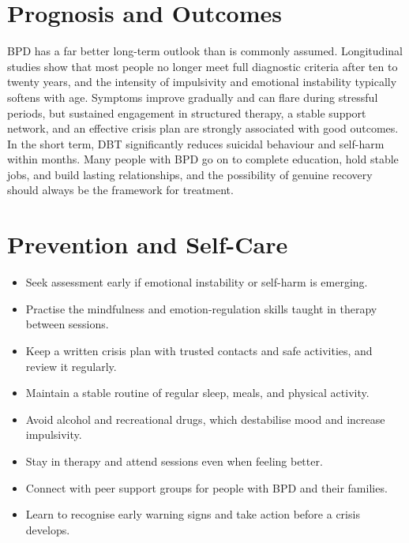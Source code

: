 \section*{Prognosis and Outcomes}
BPD has a far better long-term outlook than is commonly assumed. Longitudinal studies show that most people no longer meet full diagnostic criteria after ten to twenty years, and the intensity of impulsivity and emotional instability typically softens with age. Symptoms improve gradually and can flare during stressful periods, but sustained engagement in structured therapy, a stable support network, and an effective crisis plan are strongly associated with good outcomes. In the short term, DBT significantly reduces suicidal behaviour and self-harm within months. Many people with BPD go on to complete education, hold stable jobs, and build lasting relationships, and the possibility of genuine recovery should always be the framework for treatment.

\section*{Prevention and Self-Care}
\begin{itemize}
    \item Seek assessment early if emotional instability or self-harm is emerging.
    \item Practise the mindfulness and emotion-regulation skills taught in therapy between sessions.
    \item Keep a written crisis plan with trusted contacts and safe activities, and review it regularly.
    \item Maintain a stable routine of regular sleep, meals, and physical activity.
    \item Avoid alcohol and recreational drugs, which destabilise mood and increase impulsivity.
    \item Stay in therapy and attend sessions even when feeling better.
    \item Connect with peer support groups for people with BPD and their families.
    \item Learn to recognise early warning signs and take action before a crisis develops.
\end{itemize}

